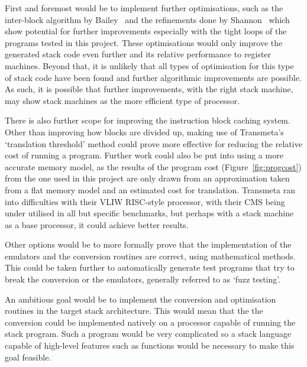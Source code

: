 First and foremost would be to implement further optimisations, such as the
inter-block algorithm by Bailey~\cite{Bailey2000Inter} and the refinements done
by Shannon~\cite{Shannon2006AC} which show potential for further improvements
especially with the tight loops of the programs tested in this project. These
optimisations would only improve the generated stack code even further and its
relative performance to register machines. Beyond that, it is unlikely that all
types of optimisation for this type of stack code have been found and further
algorithmic improvements are possible. As such, it is possible that further
improvements, with the right stack machine, may show stack machines as the more
efficient type of processor.

There is also further scope for improving the instruction block caching system.
Other than improving how blocks are divided up, making use of Transmeta's
`translation threshold' method could prove more effective for reducing the
relative cost of running a program. Further work could also be put into using a
more accurate memory model, as the results of the program cost
(Figure~\ref{fig:progcost}) from the one used in this project are only drawn
from an approximation taken from a flat memory model and an estimated cost for
translation. Transmeta ran into difficulties with their VLIW RISC-style
processor, with their CMS being under utilised in all but specific benchmarks,
but perhaps with a stack machine as a base processor, it could achieve better
results.

Other options would be to more formally prove that the implementation of the
emulators and the conversion routines are correct, using mathematical methods.
This could be taken further to automatically generate test programs that try to
break the conversion or the emulators, generally referred to as `fuzz testing'.

An ambitious goal would be to implement the conversion and optimisation routines
in the target stack architecture. This would mean that the the conversion could
be implemented natively on a processor capable of running the stack program.
Such a program would be very complicated so a stack language capable of
high-level features such as functions would be necessary to make this goal
feasible.
